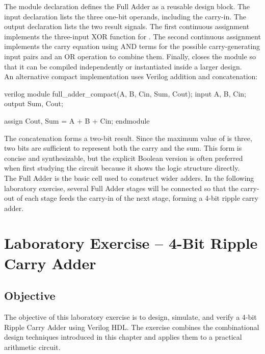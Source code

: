 \noindent The module declaration defines the Full Adder as a reusable design block. The input
declaration lists the three one-bit operands, including the carry-in. The output declaration lists
the two result signals. The first continuous assignment implements the three-input XOR function for
. The second continuous assignment implements the carry equation using AND terms
for the possible carry-generating input pairs and an OR operation to combine them. Finally,
 closes the module so that it can be compiled independently or instantiated
inside a larger design.\\

\noindent An alternative compact implementation uses Verilog addition and concatenation:

\begin{codeblock}{verilog}
module full_adder_compact(A, B, Cin, Sum, Cout);
    input A, B, Cin;
    output Sum, Cout;

    assign {Cout, Sum} = A + B + Cin;
endmodule
\end{codeblock}

\noindent The concatenation  forms a two-bit result. Since the maximum value
of  is three, two bits are sufficient to represent both the carry and the
sum. This form is concise and synthesizable, but the explicit Boolean version is often preferred
when first studying the circuit because it shows the logic structure directly.\\

\noindent The Full Adder is the basic cell used to construct wider adders. In the following
laboratory exercise, several Full Adder stages will be connected so that the carry-out of each stage
feeds the carry-in of the next stage, forming a 4-bit ripple carry adder.

\section{Laboratory Exercise -- 4-Bit Ripple Carry Adder}

\subsection{Objective}
The objective of this laboratory exercise is to design, simulate, and verify a 4-bit Ripple Carry
Adder using Verilog HDL. The exercise combines the combinational design techniques introduced in
this chapter and applies them to a practical arithmetic circuit.\\

